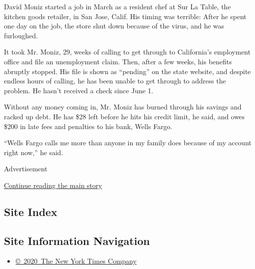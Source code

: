 David Moniz started a job in March as a resident chef at Sur La Table,
the kitchen goods retailer, in San Jose, Calif. His timing was terrible:
After he spent one day on the job, the store shut down because of the
virus, and he was furloughed.

It took Mr. Moniz, 29, weeks of calling to get through to California's
employment office and file an unemployment claim. Then, after a few
weeks, his benefits abruptly stopped. His file is shown as ``pending''
on the state website, and despite endless hours of calling, he has been
unable to get through to address the problem. He hasn't received a check
since June 1.

Without any money coming in, Mr. Moniz has burned through his savings
and racked up debt. He has \$28 left before he hits his credit limit, he
said, and owes \$200 in late fees and penalties to his bank, Wells
Fargo.

``Wells Fargo calls me more than anyone in my family does because of my
account right now,'' he said.

Advertisement

\protect\hyperlink{after-bottom}{Continue reading the main story}

\hypertarget{site-index}{%
\subsection{Site Index}\label{site-index}}

\hypertarget{site-information-navigation}{%
\subsection{Site Information
Navigation}\label{site-information-navigation}}

\begin{itemize}
\tightlist
\item
  \href{https://help.nytimes3xbfgragh.onion/hc/en-us/articles/115014792127-Copyright-notice}{©~2020~The
  New York Times Company}
\end{itemize}

